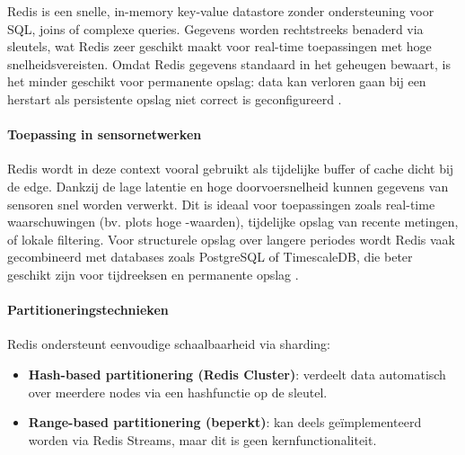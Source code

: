 Redis is een snelle, in-memory key-value datastore zonder ondersteuning voor SQL, joins of complexe queries. Gegevens worden rechtstreeks benaderd via sleutels, wat Redis zeer geschikt maakt voor real-time toepassingen met hoge snelheidsvereisten. Omdat Redis gegevens standaard in het geheugen bewaart, is het minder geschikt voor permanente opslag: data kan verloren gaan bij een herstart als persistente opslag niet correct is geconfigureerd \autocite{RedisDocumentation}.

\paragraph{Toepassing in sensornetwerken}  
Redis wordt in deze context vooral gebruikt als tijdelijke buffer of cache dicht bij de edge. Dankzij de lage latentie en hoge doorvoersnelheid kunnen gegevens van sensoren snel worden verwerkt. Dit is ideaal voor toepassingen zoals real-time waarschuwingen (bv. plots hoge -waarden), tijdelijke opslag van recente metingen, of lokale filtering. Voor structurele opslag over langere periodes wordt Redis vaak gecombineerd met databases zoals PostgreSQL of TimescaleDB, die beter geschikt zijn voor tijdreeksen en permanente opslag \autocite{Mahmud2020, RedisDocumentation}.

\paragraph{Partitioneringstechnieken}  
Redis ondersteunt eenvoudige schaalbaarheid via sharding:
\begin{itemize}
    \item \textbf{Hash-based partitionering (Redis Cluster)}: verdeelt data automatisch over meerdere nodes via een hashfunctie op de sleutel.
    \item \textbf{Range-based partitionering (beperkt)}: kan deels geïmplementeerd worden via Redis Streams, maar dit is geen kernfunctionaliteit.
\end{itemize}

